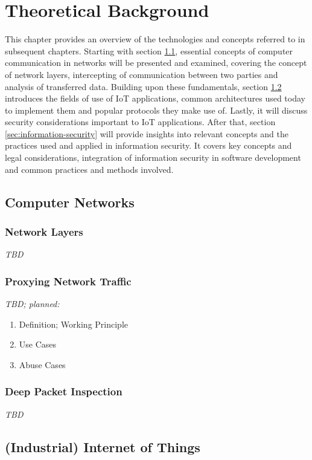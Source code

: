 \chapter{Theoretical Background}
\label{chap:theoretical-background}
This chapter provides an overview of the technologies and concepts referred to in subsequent chapters.
Starting with section \ref{sec:computer-networks}, essential concepts of computer communication in networks will be presented and examined, covering the concept of network layers, intercepting of communication between two parties and analysis of transferred data.
Building upon these fundamentals, section \ref{sec:internet-of-things} introduces the fields of use of \ac{IoT} applications, common architectures used today to implement them and popular protocols they make use of. Lastly, it will discuss security considerations important to \ac{IoT} applications.
After that, section \ref{sec:information-security} will provide insights into relevant concepts and the practices used and applied in information security. It covers key concepts and legal considerations, integration of information security in software development and common practices and methods involved. 

\section{Computer Networks}
\label{sec:computer-networks}
\subsection{Network Layers}
\emph{TBD} %

\subsection{Proxying Network Traffic}
\emph{TBD; planned:} %
\begin{enumerate}
    \item Definition; Working Principle
    \item Use Cases
    \item Abuse Cases
\end{enumerate}

\subsection{Deep Packet Inspection}
\emph{TBD} %

\section{(Industrial) Internet of Things}
\label{sec:internet-of-things}
